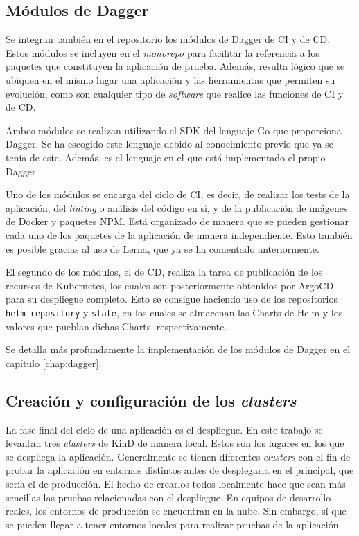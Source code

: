 \subsection*{Módulos de Dagger}

Se integran también en el repositorio los módulos de Dagger de CI y de CD. Estos módulos se incluyen en el \textit{monorepo} para facilitar la referencia a los paquetes que constituyen la aplicación de prueba. Además, resulta lógico que se ubiquen en el mismo lugar una aplicación y las herramientas que permiten su evolución, como son cualquier tipo de \textit{software} que realice las funciones de CI y de CD.

Ambos módulos se realizan utilizando el SDK del lenguaje Go que proporciona Dagger. Se ha escogido este lenguaje debido al conocimiento previo que ya se tenía de este. Además, es el lenguaje en el que está implementado el propio Dagger.

Uno de los módulos se encarga del ciclo de CI, es decir, de realizar los tests de la aplicación, del \textit{linting} o análisis del código en sí, y de la publicación de imágenes de Docker y paquetes NPM. Está organizado de manera que se pueden gestionar cada uno de los paquetes de la aplicación de manera independiente. Esto también es posible gracias al uso de Lerna, que ya se ha comentado anteriormente.

El segundo de los módulos, el de CD, realiza la tarea de publicación de los recursos de Kubernetes, los cuales son posteriormente obtenidos por ArgoCD para su despliegue completo. Esto se consigue haciendo uso de los repositorios \texttt{helm-repository} y \texttt{state}, en los cuales se almacenan las Charts de Helm y los valores que pueblan dichas Charts, respectivamente.

Se detalla más profundamente la implementación de los módulos de Dagger en el capítulo \ref{chap:dagger}.

\subsection*{Creación y configuración de los \textit{clusters}}
\label{subsec:clusters}

La fase final del ciclo de una aplicación es el despliegue. En este trabajo se levantan tres \textit{clusters} de KinD de manera local. Estos son los lugares en los que se despliega la aplicación. Generalmente se tienen diferentes \textit{clusters} con el fin de probar la aplicación en entornos distintos antes de desplegarla en el principal, que sería el de producción. El hecho de crearlos todos localmente hace que sean más sencillas las pruebas relacionadas con el despliegue. En equipos de desarrollo reales, los entornos de producción se encuentran en la nube. Sin embargo, sí que se pueden llegar a tener entornos locales para realizar pruebas de la aplicación.

